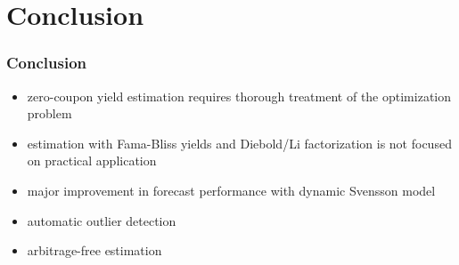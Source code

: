 \section{Conclusion}
\begin{frame}
  \frametitle{Conclusion}
  \begin{itemize}
  \item zero-coupon yield estimation requires thorough treatment of the optimization problem
  \item estimation with Fama-Bliss yields and Diebold/Li factorization is not focused on practical application 
  \item major improvement in forecast performance with dynamic Svensson model
  \end{itemize}
  
  \vspace{0.5cm}

  \begin{itemize}
  \item automatic outlier detection
   \item arbitrage-free estimation
  \end{itemize}
\end{frame}